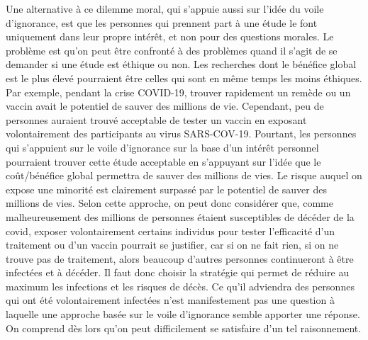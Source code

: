 \documentclass[
  12pt,
]{book}
\begin{document}
Une alternative à ce dilemme moral, qui s'appuie aussi sur l'idée du voile d'ignorance, est que les personnes qui prennent part à une étude le font uniquement dans leur propre intérêt, et non pour des questions morales. Le problème est qu'on peut être confronté à des problèmes quand il s'agit de se demander si une étude est éthique ou non. Les recherches dont le bénéfice global est le plus élevé pourraient être celles qui sont en même temps les moins éthiques. Par exemple, pendant la crise COVID-19, trouver rapidement un remède ou un vaccin avait le potentiel de sauver des millions de vie. Cependant, peu de personnes auraient trouvé acceptable de tester un vaccin en exposant volontairement des participants au virus SARS-COV-19. Pourtant, les personnes qui s'appuient sur le voile d'ignorance sur la base d'un intérêt personnel pourraient trouver cette étude acceptable en s'appuyant sur l'idée que le coût/bénéfice global permettra de sauver des millions de vies. Le risque auquel on expose une minorité est clairement surpassé par le potentiel de sauver des millions de vies.
Selon cette approche, on peut donc considérer que, comme malheureusement des millions de personnes étaient susceptibles de décéder de la covid, exposer volontairement certains individus pour tester l'efficacité d'un traitement ou d'un vaccin pourrait se justifier, car si on ne fait rien, si on ne trouve pas de traitement, alors beaucoup d'autres personnes continueront à être infectées et à décéder. Il faut donc choisir la stratégie qui permet de réduire au maximum les infections et les risques de décès. Ce qu'il adviendra des personnes qui ont été volontairement infectées n'est manifestement pas une question à laquelle une approche basée sur le voile d'ignorance semble apporter une réponse. On comprend dès lors qu'on peut difficilement se satisfaire d'un tel raisonnement.
\end{document}

